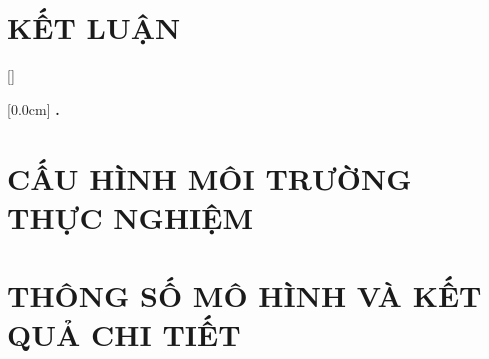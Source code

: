 \documentclass[a4paper,13pt,3p,oneside]{report}
\renewcommand{\bibname}{Danh_sach_tai_lieu_tham_khao}
\theoremstyle{definition}
\begin{document}
\chapter*{KẾT LUẬN}




\newpage
\renewcommand\bibname{TÀI LIỆU THAM KHẢO}
\printbibliography
{}

\appendixpage
\appendix
\addappheadtotoc

[]
\titlespacing*{\chapter}{0pt}{-20pt}{20pt}

    [0.0cm]             %
    {\bfseries\vspace{0.3cm}}                  %
    {{\bfseries{\scshape} \thecontentslabel.\ }} %
    {}         %
    {\contentspage} 
    
\chapter{CẤU HÌNH MÔI TRƯỜNG THỰC NGHIỆM}


\newpage
\chapter{THÔNG SỐ MÔ HÌNH VÀ KẾT QUẢ CHI TIẾT}

\end{document}
